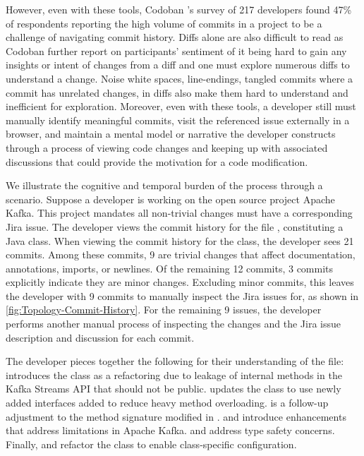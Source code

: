 However, even with these tools, Codoban \etal's \cite{codoban_software_2015} survey of 217 developers found 47\% of respondents reporting the high volume of commits in a project to be a challenge of navigating commit history. 
Diffs alone are also difficult to read as Codoban \etal \cite{codoban_software_2015} further report on participants' sentiment of it being hard to gain any insights or intent of changes from a diff and one must explore numerous diffs to understand a change. 
Noise \eg white spaces, line-endings, tangled commits where a commit has unrelated changes, \etc in diffs also make them hard to understand and inefficient for exploration. 
Moreover, even with these tools, a developer still must manually identify meaningful commits, visit the referenced issue externally in a browser, and maintain a mental model or narrative the developer constructs through a process of viewing code changes and keeping up with associated discussions that could provide the motivation for a code modification. 

We illustrate the cognitive and temporal burden of the process through a scenario.
Suppose a developer is working on the open source project Apache Kafka. 
This project mandates all non-trivial changes must have a corresponding Jira issue. 
The developer views the commit history for the file , constituting a Java class. 
When viewing the commit history for the  class, the developer sees 21 commits.
Among these commits, 9 are trivial changes that affect documentation, annotations, imports, or newlines. 
Of the remaining 12 commits, 3 commits explicitly indicate they are minor changes.
Excluding minor commits, this leaves the developer with 9 commits to manually inspect the Jira issues for, as shown in \autoref{fig:Topology-Commit-History}.
For the remaining 9 issues, the developer performs another manual process of inspecting the changes and the Jira issue description and discussion for each commit.

The developer pieces together the following for their understanding of the file: 
 introduces the  class as a refactoring due to leakage of internal methods in the Kafka Streams API that should not be public.
 updates the  class to use newly added interfaces added to reduce heavy method overloading.
 is a follow-up adjustment to the method signature modified in .
 and  introduce enhancements that address limitations in Apache Kafka.
 and  address type safety concerns.
Finally,  and  refactor the  class to enable class-specific configuration.


